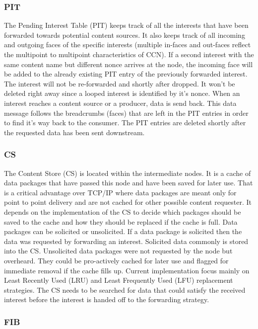 \subsubsection{PIT}

The Pending Interest Table (PIT) keeps track of all the interests that have been forwarded towards potential content sources. It also keeps track of all incoming and outgoing faces of the specific interests (multiple in-faces and out-faces reflect the multipoint to multipoint characteristics of CCN). If a second interest with the same content name but different nonce arrives at the node, the incoming face will be added to the already existing PIT entry of the previously forwarded interest. The interest will not be re-forwarded and shortly after dropped. It won't be deleted right away since a looped interest is identified by it's nonce. When an interest reaches a content source or a producer, data is send back.  This data message follows the breadcrumbs (faces) that are left in the PIT entries in order to find it's way back to the consumer. The PIT entries are deleted shortly after the requested data has been sent downstream.

\subsubsection{CS} 

The Content Store (CS) is located within the intermediate nodes. It is a cache of data packages that have passed this node and have been saved for later use. That is a critical advantage over TCP/IP where data packages are meant only for point to point delivery and are not cached for other possible content requester. It depends on the implementation of the CS to decide which packages should be saved to the cache and how they should be replaced if the cache is full. Data packages can be solicited or unsolicited. If a data package is solicited then the data was requested by forwarding an interest. Solicited data commonly is stored into the CS. Unsolicited data packages were not requested by the node but overheard. They could be pro-actively cached for later use and flagged for immediate removal if the cache fills up. Current implementation focus mainly on Least Recently Used (LRU) and Least Frequently Used (LFU) replacement strategies. The CS needs to be searched for data that could satisfy the received interest before the interest is handed off to the forwarding strategy.

\subsubsection{FIB}


